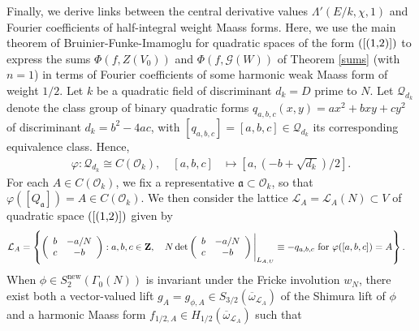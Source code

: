 \documentclass{amsart}
\theoremstyle{definition}
\theoremstyle{definition}
\theoremstyle{definition}
\begin{document}
Finally, we derive links between the central derivative values $\Lambda'(E/k, \chi, 1)$ and Fourier coefficients of half-integral weight Maass forms. 
Here, we use the main theorem of Bruinier-Funke-Imamoglu \cite{BFI} for quadratic spaces of the form $(\ref{(1,2)})$ to express the sums
$\Phi(f, Z(V_0))$ and $\Phi(f, \mathcal{G}(W))$ of Theorem \ref{sums} (with $n=1$) in terms of Fourier coefficients of some harmonic weak Maass form of weight $1/2$. 
Let $k$ be a quadratic field of discriminant $d_k = D$ prime to $N$. Let $\mathcal{Q}_{d_k}$ denote the class group of binary quadratic forms
$q_{a,b,c}(x, y) = ax^2 + b xy + c y^2$ of discriminant $d_k = b^2 - 4ac$, with $[q_{a, b, c}] = [a, b, c] \in \mathcal{Q}_{d_k}$ its corresponding equivalence class. Hence,
\begin{align*} \varphi: \mathcal{Q}_{d_k} \cong C(\mathcal{O}_k), \quad [a, b, c] 
&\longmapsto [a, (-b + \sqrt{d_k})/2]. \end{align*}
For each $A \in C(\mathcal{O}_k)$, we fix a representative $\mathfrak{a} \subset \mathcal{O}_k$, so that $\varphi([Q_{\mathfrak{a}}]) = A \in C(\mathcal{O}_k)$. 
We then consider the lattice $\mathcal{L}_A = \mathcal{L}_A(N) \subset V$ of quadratic space $(\ref{(1,2)})$ given by 
\begin{align*} \mathcal{L}_A 
&= \left\lbrace \left( \begin{array}{cc} b & - a/N \\ c & - b \end{array} \right) : a, b, c \in {\bf{Z}}, \quad
N \det \left( \begin{array}{cc} b & - a/N \\ c & - b \end{array} \right)  \Bigg\vert_{L_{A,U}} \equiv - q_{a,b,c} \text{ for } \varphi([a, b, c]) = A \right\rbrace. \end{align*}
When $\phi \in S_2^{\operatorname{new}}(\Gamma_0(N))$ is invariant under the Fricke involution $w_N$,
there exist both a vector-valued lift $g_A = g_{\phi, A} \in S_{3/2}(\overline{\omega}_{\mathcal{L}_A})$ of the 
Shimura lift of $\phi$ and a harmonic Maass form $f_{1/2, A} \in H_{1/2}(\overline{\omega}_{\mathcal{L}_A})$ such that 
\end{document}
